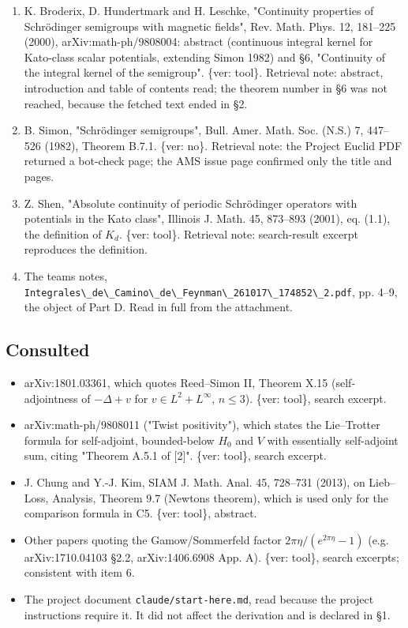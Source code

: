 \documentclass[11pt,a4paper]{article}
\providecommand{\passthrough}[1]{#1}
\providecommand{\tightlist}{\setlength{\itemsep}{0pt}\setlength{\parskip}{0pt}}
\begin{document}
\begin{enumerate}
\item
  K. Broderix, D. Hundertmark and H. Leschke, "Continuity properties of Schrödinger semigroups with magnetic fields", Rev. Math. Phys. 12, 181--225 (2000), arXiv:math-ph/9808004: abstract (continuous integral kernel for Kato-class scalar potentials, extending Simon 1982) and §6, "Continuity of the integral kernel of the semigroup". \{ver: tool\}. Retrieval note: abstract, introduction and table of contents read; the theorem number in §6 was not reached, because the fetched text ended in §2.
\item
  B. Simon, "Schrödinger semigroups", Bull. Amer. Math. Soc. (N.S.) 7, 447--526 (1982), Theorem B.7.1. \{ver: no\}. Retrieval note: the Project Euclid PDF returned a bot-check page; the AMS issue page confirmed only the title and pages.
\item
  Z. Shen, "Absolute continuity of periodic Schrödinger operators with potentials in the Kato class", Illinois J. Math. 45, 873--893 (2001), eq. (1.1), the definition of \(K_d\). \{ver: tool\}. Retrieval note: search-result excerpt reproduces the definition.
\item
  The team\textquotesingle s notes, \passthrough{\lstinline!Integrales\_de\_Camino\_de\_Feynman\_261017\_174852\_2.pdf!}, pp. 4--9, the object of Part D. Read in full from the attachment.
\end{enumerate}

\hypertarget{consulted}{%
\subsection{Consulted}\label{consulted}}

\begin{itemize}
\tightlist
\item
  arXiv:1801.03361, which quotes Reed--Simon II, Theorem X.15 (self-adjointness of \(-\Delta+v\) for \(v\in L^2+L^\infty\), \(n\le3\)). \{ver: tool\}, search excerpt.
\item
  arXiv:math-ph/9808011 ("Twist positivity"), which states the Lie--Trotter formula for self-adjoint, bounded-below \(H_0\) and \(V\) with essentially self-adjoint sum, citing "Theorem A.5.1 of {[}2{]}". \{ver: tool\}, search excerpt.
\item
  J. Chung and Y.-J. Kim, SIAM J. Math. Anal. 45, 728--731 (2013), on Lieb--Loss, Analysis, Theorem 9.7 (Newton\textquotesingle s theorem), which is used only for the comparison formula in C5. \{ver: tool\}, abstract.
\item
  Other papers quoting the Gamow/Sommerfeld factor \(2\pi\eta/(e^{2\pi\eta}-1)\) (e.g. arXiv:1710.04103 §2.2, arXiv:1406.6908 App. A). \{ver: tool\}, search excerpts; consistent with item 6.
\item
  The project document \passthrough{\lstinline!claude/start-here.md!}, read because the project instructions require it. It did not affect the derivation and is declared in §1.
\end{itemize}
\end{document}
